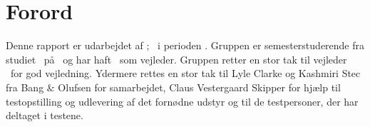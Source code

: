 \chapter*{Forord}
\label{Forord}
Denne rapport er udarbejdet af \groupname; \groupmembers\ i perioden \projectperiod. Gruppen er \semester semesterstuderende fra studiet \studyname\ på \universityname\ og har haft \supervisor\ som vejleder. Gruppen retter en stor tak til vejleder \supervisor\ for god vejledning. Ydermere rettes en stor tak til Lyle Clarke og Kashmiri Stec fra Bang $\&$ Olufsen for samarbejdet, Claus Vestergaard Skipper for hjælp til testopstilling og udlevering af det fornødne udstyr og til de testpersoner, der har deltaget i testene. 

%
